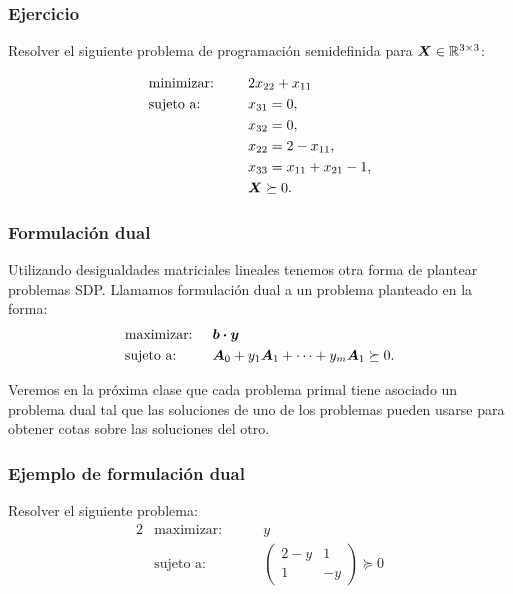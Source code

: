 \documentclass[aspectratio=169,12pt,spanish]{beamer}
\begin{document}

\begin{frame}
\frametitle{Ejercicio}

Resolver el siguiente problema de programación semidefinida para $\bm{X} \in \mathbb{R}^{3\times3}$:

\begin{alignat*}{2}
  & \text{minimizar: } & & 2 x_{22}+x_{11}  \\
  & \text{sujeto a: } & \quad & x_{31} = 0, \\
  &&& x_{32} = 0, \\
  &&& x_{22} = 2 - x_{11}, \\
  &&& x_{33} = x_{11}+x_{21}-1, \\
   &&  &\bm{X}\succeq 0.
\end{alignat*}


\end{frame}


\begin{frame}
\frametitle{Formulación dual}

Utilizando desigualdades matriciales lineales tenemos otra forma de plantear problemas SDP. Llamamos formulación dual a un problema planteado en la forma:
\begin{alignat*}{2}
  & \text{maximizar: } & & \bm{b} \boldsymbol{\cdot} \bm{y}  \\
  & \text{sujeto a: } & & \bm{A}_0 + y_1 \bm{A}_1 + \dots + y_m \bm{A}_1 \succeq 0. \\
\end{alignat*}

Veremos en la próxima clase que cada problema primal tiene asociado un problema dual tal que las soluciones de uno de los problemas pueden usarse para obtener cotas sobre las soluciones del otro.

\end{frame}


\begin{frame}
\frametitle{Ejemplo de formulación dual}

Resolver el siguiente problema:
\begin{alignat*}{2}
  & \text{maximizar: } & \quad & y  \\
  & \text{sujeto a: } & & \begin{pmatrix} 2-y &  1 \\ 1 & -y \end{pmatrix} \succeq 0\\
\end{alignat*}

\end{frame}
\end{document}
